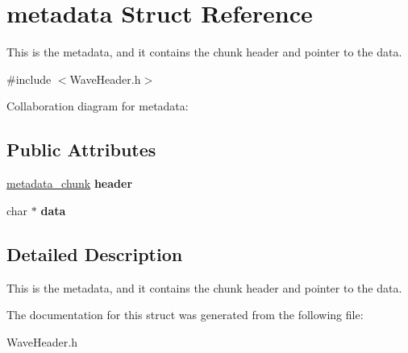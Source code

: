 \hypertarget{structmetadata}{}\section{metadata Struct Reference}
\label{structmetadata}


This is the metadata, and it contains the chunk header and pointer to the data.  




{\ttfamily \#include $<$Wave\+Header.\+h$>$}



Collaboration diagram for metadata\+:
\subsection*{Public Attributes}
\begin{DoxyCompactItemize}
\item 
\mbox{\label{structmetadata_ad164d8ee72ad8fa5c8a67afdc8498d81}} 
\hyperlink{structmetadata__chunk}{metadata\+\_\+chunk} {\bfseries header}
\item 
\mbox{\label{structmetadata_ad0739602365064817f8f4fb04e4c6532}} 
char $\ast$ {\bfseries data}
\end{DoxyCompactItemize}


\subsection{Detailed Description}
This is the metadata, and it contains the chunk header and pointer to the data. 

The documentation for this struct was generated from the following file\+:\begin{DoxyCompactItemize}
\item 
Wave\+Header.\+h\end{DoxyCompactItemize}
